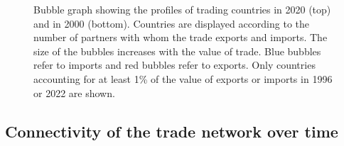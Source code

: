 \documentclass[
  authoryear,
  review,
  3p]{elsarticle}
\begin{document}
\begin{figure}[p]


\caption{\label{fig-countries-profiles}Bubble graph showing the profiles
of trading countries in 2020 (top) and in 2000 (bottom). Countries are
displayed according to the number of partners with whom the trade
exports and imports. The size of the bubbles increases with the value of
trade. Blue bubbles refer to imports and red bubbles refer to exports.
Only countries accounting for at least 1\% of the value of exports or
imports in 1996 or 2022 are shown.}

\end{figure}%

\subsection{Connectivity of the trade network over
time}\label{connectivity-of-the-trade-network-over-time}
\end{document}
